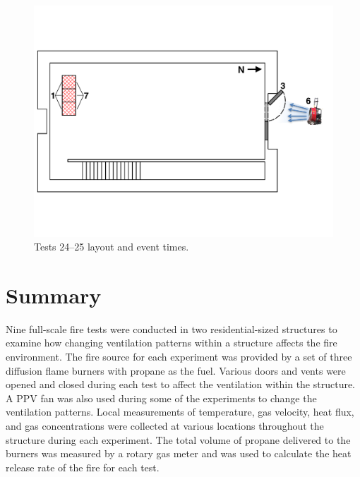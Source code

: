 \documentclass[12pt,oneside]{book}
\begin{document}
\begin{figure}[!ht]
\begin{minipage}[b]{0.9\columnwidth}
	\includegraphics[width=0.97\columnwidth]{../Figures/Floor_Plans/West_Structure_1st_Floor_Test_24}
\end{minipage}
\caption{Tests 24--25 layout and event times.}
\label{fig:west_test_24}
\end{figure}
\clearpage

\chapter{Summary}
\label{chap:Summary}
Nine full-scale fire tests were conducted in two residential-sized structures to examine how changing ventilation patterns within a structure affects the fire environment. The fire source for each experiment was provided by a set of three diffusion flame burners with propane as the fuel. Various doors and vents were opened and closed during each test to affect the ventilation within the structure. A PPV fan was also used during some of the experiments to change the ventilation patterns. Local measurements of temperature, gas velocity, heat flux, and gas concentrations were collected at various locations throughout the structure during each experiment. The total volume of propane delivered to the burners was measured by a rotary gas meter and was used to calculate the heat release rate of the fire for each test.    



\appendix
\end{document}
